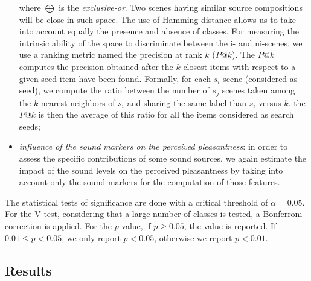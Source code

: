 \documentclass[12pt]{elsarticle}
\begin{document}
\begin{itemize}
where $\bigoplus$ is the \emph{exclusive-or}. Two scenes having similar source compositions will be close in such space. The use of Hamming distance allows us to take into account equally the presence and absence of classes. For measuring the intrinsic ability of the space to discriminate between the i- and ni-scenes, we use a ranking metric named the precision at rank $k$ ($P@k$). The $P@k$ computes the precision obtained after the $k$ closest items with respect to a given seed item have been found. Formally, for each $s_i$ scene (considered as seed), we compute the ratio between the number of $s_j$ scenes taken among the $k$ nearest neighbors of $s_i$ and sharing the same label than $s_i$ versus $k$. the $P@k$ is then the average of this ratio for all the items considered as search seeds;


\item \emph{influence of the sound markers on the perceived pleasantness}: in order to assess the specific contributions of some sound sources, we again estimate the impact of the sound levels on the perceived pleasantness by taking into account only the sound markers for the computation of those features.
\end{itemize}


The statistical tests of significance are done with a critical threshold of $\alpha=0.05$. For the V-test, considering that a large number of classes is tested, a Bonferroni correction is applied. For the $p$-value, if $p\geq0.05$, the value is reported. If $0.01\leq p<0.05$, we only report $p<0.05$, otherwise we report $p<0.01$.

\subsection{Results}
\end{document}
